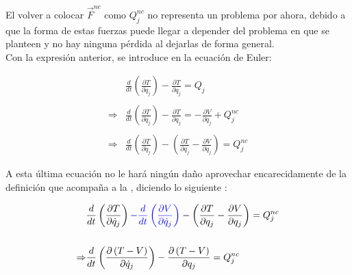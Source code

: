 \documentclass[/home/hernan/Documentos/Apuntes_mecanica_teorica/main.tex]{subfiles}
\begin{document}
    El volver a colocar $ \vec{F}^{nc}$ como $ Q_{j}^{nc}$ no representa un problema por ahora, debido a que la forma de estas fuerzas puede llegar a depender del problema en que se planteen y no hay ninguna pérdida al dejarlas de forma general. \\ 

    Con la expresión anterior, se introduce en la ecuación de Euler:

    \begin{align*}
        & \frac{d}{d t} \left(\frac{\partial T}{\partial \dot{q}_{j}} \right) - \frac{\partial T}{\partial q_{j}} = Q_{j} \\ 
        \\
        \Rightarrow & \frac{d}{d t} \left(\frac{\partial T}{\partial \dot{q}_{j}} \right) - \frac{\partial T}{\partial q_{j}} = - \frac{\partial V}{\partial q_{j}} + Q_{j}^{nc} \\ 
        \\
        \Rightarrow & \frac{d}{d t} \left(\frac{\partial T}{\partial \dot{q}_{j}} \right) - \left(\frac{\partial T}{\partial q_{j}} - \frac{\partial V}{\partial q_{j}}\right) =  Q_{j}^{nc}
    \end{align*}

    A esta última ecuación no le hará ningún daño aprovechar encarecidamente de la definición que acompaña a la , diciendo lo siguiente :

    \begin{align*}
        & \frac{d}{d t} \left(\frac{\partial T}{\partial \dot{q}_{j}} \right) \textcolor{blue}{-\frac{d}{d t} \left(\frac{\partial V}{\partial \dot{q}_{j}}\right) } - \left(\frac{\partial T}{\partial q_{j}} - \frac{\partial V}{\partial q_{j}}\right) =  Q_{j}^{nc} \\ 
        \\
        \Rightarrow & \frac{d}{d t} \left(\frac{\partial \left(T - V\right) }{\partial \dot{q}_{j}} \right) - \frac{\partial \left(T - V\right)}{\partial q_{j}} =  Q_{j}^{nc} \\
    \end{align*}
\end{document}
